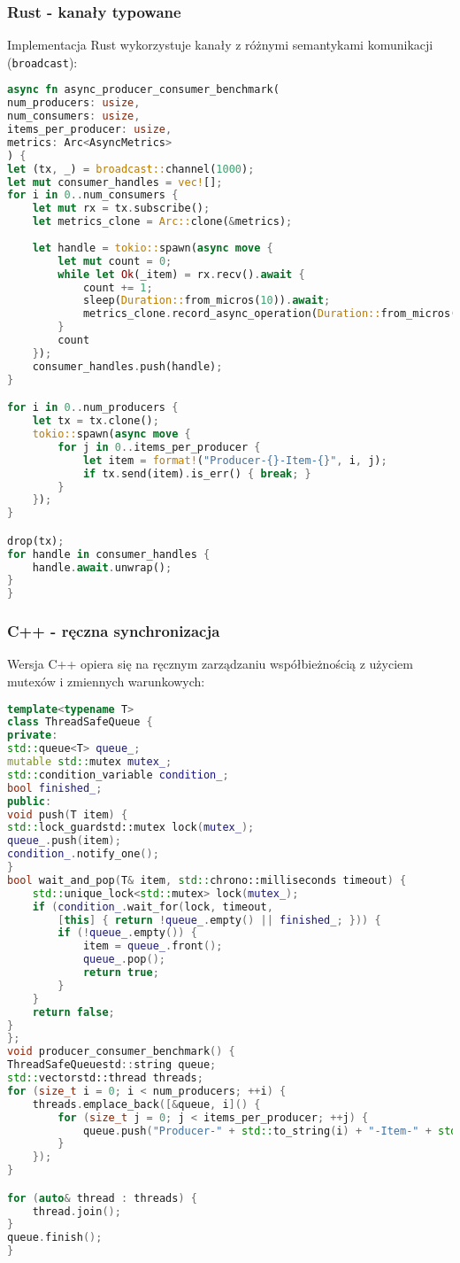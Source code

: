\subsubsection{Rust - kanały typowane}
Implementacja Rust wykorzystuje kanały z różnymi semantykami komunikacji (\texttt{broadcast}):
\begin{lstlisting}[language=Rust, caption={Producent-Konsument w Rust z broadcast channels}, label={lst:rust_producer_consumer}]
async fn async_producer_consumer_benchmark(
num_producers: usize,
num_consumers: usize,
items_per_producer: usize,
metrics: Arc<AsyncMetrics>
) {
let (tx, _) = broadcast::channel(1000);
let mut consumer_handles = vec![];
for i in 0..num_consumers {
    let mut rx = tx.subscribe();
    let metrics_clone = Arc::clone(&metrics);
    
    let handle = tokio::spawn(async move {
        let mut count = 0;
        while let Ok(_item) = rx.recv().await {
            count += 1;
            sleep(Duration::from_micros(10)).await;
            metrics_clone.record_async_operation(Duration::from_micros(10));
        }
        count
    });
    consumer_handles.push(handle);
}

for i in 0..num_producers {
    let tx = tx.clone();
    tokio::spawn(async move {
        for j in 0..items_per_producer {
            let item = format!("Producer-{}-Item-{}", i, j);
            if tx.send(item).is_err() { break; }
        }
    });
}

drop(tx);
for handle in consumer_handles {
    handle.await.unwrap();
}
}
\end{lstlisting}

\subsubsection{C++ - ręczna synchronizacja}
Wersja C++ opiera się na ręcznym zarządzaniu współbieżnością z użyciem mutexów i zmiennych warunkowych:
\begin{lstlisting}[language=C++, caption={Producent-Konsument w C++ z ThreadSafeQueue}, label={lst:cpp_producer_consumer}]
template<typename T>
class ThreadSafeQueue {
private:
std::queue<T> queue_;
mutable std::mutex mutex_;
std::condition_variable condition_;
bool finished_;
public:
void push(T item) {
std::lock_guardstd::mutex lock(mutex_);
queue_.push(item);
condition_.notify_one();
}
bool wait_and_pop(T& item, std::chrono::milliseconds timeout) {
    std::unique_lock<std::mutex> lock(mutex_);
    if (condition_.wait_for(lock, timeout, 
        [this] { return !queue_.empty() || finished_; })) {
        if (!queue_.empty()) {
            item = queue_.front();
            queue_.pop();
            return true;
        }
    }
    return false;
}
};
void producer_consumer_benchmark() {
ThreadSafeQueuestd::string queue;
std::vectorstd::thread threads;
for (size_t i = 0; i < num_producers; ++i) {
    threads.emplace_back([&queue, i]() {
        for (size_t j = 0; j < items_per_producer; ++j) {
            queue.push("Producer-" + std::to_string(i) + "-Item-" + std::to_string(j));
        }
    });
}

for (auto& thread : threads) {
    thread.join();
}
queue.finish();
}
\end{lstlisting}

